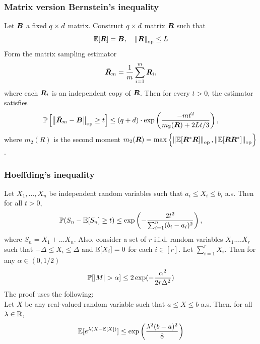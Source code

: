 \documentclass[10pt]{article}
\begin{document}
\subsubsection{Matrix version Bernstein's inequality} 
Let ${\bm{B}}$ a fixed $q \times d$ matrix. Construct $q \times d$ matrix ${\bm{R}}$ such that 
\begin{equation}
    \mathop{\mathbb{E} \displaystyle} [{\bm{R}}] = {\bm{B}}, \quad \left\lVert{\bm{R}}\right\rVert_{\text{op}} \leq L 
\end{equation}
Form the matrix sampling estimator 
\begin{equation}
    \bar{{\bm{R}}}_m = \frac{1}{m} \sum_{i=1}^m {\bm{R}}_i,
\end{equation}
where each ${\bm{R}}_i$ is an independent copy of ${\bm{R}}$. Then for every $t >0$, the estimator satisfies 
\begin{equation}
    \mathbb{P} \left[ \left\lVert\bar{{\bm{R}}}_m - {\bm{B}}\right\rVert_{\text{op}} \geq t \right] \leq (q+d) \cdot \exp \left( \frac{-m t^2}{m_2 ({\bm{R}}) + 2Lt /3} \right),
\end{equation}
where $m_2 (R)$ is the second moment $m_2({\bm{R}}) = \max \left\{  \left\lVert\mathop{\mathbb{E} \displaystyle}[{\bm{R}}^* {\bm{R}}]\right\rVert_{\text{op}}, \left\lVert\mathop{\mathbb{E} \displaystyle}[{\bm{R}} {\bm{R}}^*]\right\rVert_{\text{op}}  \right\}$.  \\ 

\subsubsection{Hoeffding's inequality}
Let $X_1, \dots, X_n$ be independent random variables such that $a_i \leq X_i \leq b_i$ a.s. Then for all $t >0$, 
\begin{equation}
    \mathbb{P}({S_n - \mathop{\mathbb{E} \displaystyle}[S_n] \geq t}) \leq \exp \left( - \frac{2t^2}{\sum_{i=1}^n (b_i -a_i)^2} \right),  
\end{equation}
where $S_n = X_1 + \dots X_n$. Also, consider a set of $r$ i.i.d. random variables $X_1. \dots X_r$ such that $- \Delta \leq X_i \leq \Delta$ and $\mathop{\mathbb{E} \displaystyle}[X_i] = 0 $ for each $i \in [r]$. Let $\sum_{i=1}^r X_i$. Then for any $\alpha \in (0,1/2)$
\begin{equation}
    \mathbb{P} [ |M| > \alpha] \leq 2 \exp( -\frac{\alpha^2}{2 r \Delta^2})
\end{equation} 
The proof uses the following: \\ 

 Let $X$ be any real-valued random variable such that $a \leq X \leq b$ a.s. Then. for all $\lambda \in \mathbb{R}$, 
\begin{equation}
    \mathop{\mathbb{E} \displaystyle} [e^{\lambda (X - \mathop{\mathbb{E} \displaystyle}[X])}] \leq \exp \left( \frac{\lambda^2 (b-a)^2}{8} \right) 
\end{equation}
\end{document}
